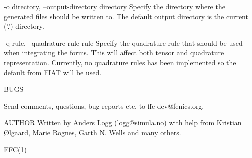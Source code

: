        -o directory, --output-directory directory
              Specify the directory where the generated files should be written
              to. The default output directory is the current ('.') directory.

       -q rule, --quadrature-rule rule
              Specify the quadrature rule that should be used when integrating
              the   forms.  This   will   affect  both  tensor and  quadrature
              representation.  Currently,  no  quadrature   rules   has   been
              implemented so the default from FIAT will be used.


       BUGS

       Send comments, questions, bug reports etc. to ffc-dev@fenics.org.

AUTHOR
       Written by Anders Logg (logg@simula.no) with help from Kristian {\O}lgaard,
       Marie Rognes, Garth N. Wells and many others.


                                                                        FFC(1)

